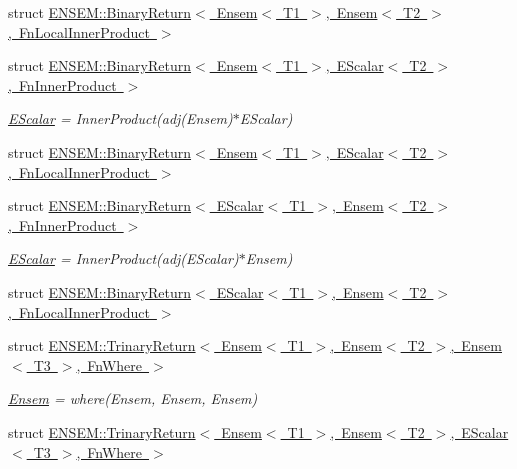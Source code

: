 \begin{DoxyCompactItemize}
struct \mbox{\hyperlink{structENSEM_1_1BinaryReturn_3_01Ensem_3_01T1_01_4_00_01Ensem_3_01T2_01_4_00_01FnLocalInnerProduct_01_4}{E\+N\+S\+E\+M\+::\+Binary\+Return$<$ Ensem$<$ T1 $>$, Ensem$<$ T2 $>$, Fn\+Local\+Inner\+Product $>$}}
\item 
struct \mbox{\hyperlink{structENSEM_1_1BinaryReturn_3_01Ensem_3_01T1_01_4_00_01EScalar_3_01T2_01_4_00_01FnInnerProduct_01_4}{E\+N\+S\+E\+M\+::\+Binary\+Return$<$ Ensem$<$ T1 $>$, E\+Scalar$<$ T2 $>$, Fn\+Inner\+Product $>$}}
\begin{DoxyCompactList}\small\item\em \mbox{\hyperlink{classENSEM_1_1EScalar}{E\+Scalar}} = Inner\+Product(adj(\+Ensem)$\ast$\+E\+Scalar) \end{DoxyCompactList}\item 
struct \mbox{\hyperlink{structENSEM_1_1BinaryReturn_3_01Ensem_3_01T1_01_4_00_01EScalar_3_01T2_01_4_00_01FnLocalInnerProduct_01_4}{E\+N\+S\+E\+M\+::\+Binary\+Return$<$ Ensem$<$ T1 $>$, E\+Scalar$<$ T2 $>$, Fn\+Local\+Inner\+Product $>$}}
\item 
struct \mbox{\hyperlink{structENSEM_1_1BinaryReturn_3_01EScalar_3_01T1_01_4_00_01Ensem_3_01T2_01_4_00_01FnInnerProduct_01_4}{E\+N\+S\+E\+M\+::\+Binary\+Return$<$ E\+Scalar$<$ T1 $>$, Ensem$<$ T2 $>$, Fn\+Inner\+Product $>$}}
\begin{DoxyCompactList}\small\item\em \mbox{\hyperlink{classENSEM_1_1EScalar}{E\+Scalar}} = Inner\+Product(adj(\+E\+Scalar)$\ast$\+Ensem) \end{DoxyCompactList}\item 
struct \mbox{\hyperlink{structENSEM_1_1BinaryReturn_3_01EScalar_3_01T1_01_4_00_01Ensem_3_01T2_01_4_00_01FnLocalInnerProduct_01_4}{E\+N\+S\+E\+M\+::\+Binary\+Return$<$ E\+Scalar$<$ T1 $>$, Ensem$<$ T2 $>$, Fn\+Local\+Inner\+Product $>$}}
\item 
struct \mbox{\hyperlink{structENSEM_1_1TrinaryReturn_3_01Ensem_3_01T1_01_4_00_01Ensem_3_01T2_01_4_00_01Ensem_3_01T3_01_4_00_01FnWhere_01_4}{E\+N\+S\+E\+M\+::\+Trinary\+Return$<$ Ensem$<$ T1 $>$, Ensem$<$ T2 $>$, Ensem$<$ T3 $>$, Fn\+Where $>$}}
\begin{DoxyCompactList}\small\item\em \mbox{\hyperlink{classENSEM_1_1Ensem}{Ensem}} = where(\+Ensem, Ensem, Ensem) \end{DoxyCompactList}\item 
struct \mbox{\hyperlink{structENSEM_1_1TrinaryReturn_3_01Ensem_3_01T1_01_4_00_01Ensem_3_01T2_01_4_00_01EScalar_3_01T3_01_4_00_01FnWhere_01_4}{E\+N\+S\+E\+M\+::\+Trinary\+Return$<$ Ensem$<$ T1 $>$, Ensem$<$ T2 $>$, E\+Scalar$<$ T3 $>$, Fn\+Where $>$}}

\end{DoxyCompactItemize}
